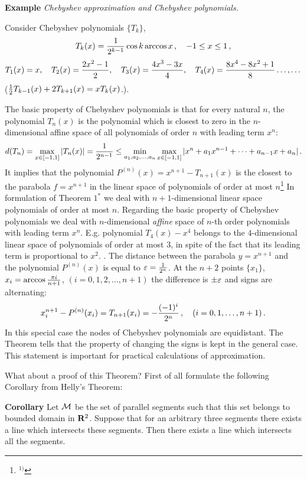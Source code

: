 {{\bf Example} {\it Chebyshev approximation and Chebyshev polynomials.}

   Consider Chebyshev polynomials $\{T_k\}$,
                      $$
T_k(x)={1\over 2^{k-1}}\cos k \arccos x\,,\quad -1\leq x\leq 1\,,
                      $$
                   $$
T_1(x)=x,\quad
T_2(x)={2x^2-1\over 2},\quad T_3(x)={4x^3-3x\over 4},\quad
  T_4(x)={8x^4-8x^2+1\over 8}\dots,\dots
                    $$
(${1\over 2}T_{k-1}(x)+2T_{k+1}(x)=xT_k(x)$.).

The basic property of Chebyshev polynomials is that for every natural
$n$, the polynomial
$T_n(x)$ is the polynomial which is 
closest to zero in the $n$-dimensional
 affine space of all polynomials
 of order $n$ with leading term $x^n$:
            $$
d(T_n)=\max_{x\in [-1,1]}|T_n(x)|={1\over 2^{n-1}}\leq
 \min_{a_1,a_2,\dots,a_n}\max_{x\in [-1,1]}
  |x^n+a_1x^{n-1}+\dots+a_{n-1}x+a_n|\,.
            $$
It implies that the 
polynomial $P^{(n)}(x)=x^{n+1}-T_{n+1}(x)$ is the closest
to the parabola $f=x^{n+1}$ in the linear space
of polynomials of order at most $n$\footnote{$^{1)}$}
{In formulation of Theorem
$1^*$ we deal with $n+1$-dimensional 
linear space polynomials of order at most $n$. 
Regarding the basic property of Chebyshev polynomials we deal with
$n$-dimensional {\it affine} space of $n$-th order  
polynomials with leading term $x^n$.
E.g. polynomial $T_4(x)-x^4$ belongs to the $4$-dimensional
linear space of polynomials of order at most $3$, 
in spite of the fact that its leading term is proportional to
$x^2$. }.
The distance between the parabola $y=x^{n+1}$
and the polynomial $P^{(n)}(x)$
is equal to ${\varepsilon}={1\over 2^n}$.
At the $n+2$ points $\{x_1\}$, $x_i=\arccos {\pi i\over n+1}$,
$(i=0,1,2,\dots,n+1)$
the difference 
is $\pm {\varepsilon}$ and signs are alternating:
         $$
  x_i^{n+1}-P^{(n)}(x_i)=T_{n+1}(x_i)=-{(-1)^i\over 2^n}\,,\quad
(i=0,1,\dots,n+1)\,.
         $$
In this special case the nodes of Chebyshev polynomials
are equidistant. The Theorem tells that
the property of changing the signs is kept in the general case.
This statement is important for practical 
calculations of approximation.              

\m
What about a proof of this Theorem?
First of all formulate the following Corollary from Helly's Theorem:

\m

  {\bf Corollary }
 Let $\cal M$ be the set of parallel segments such that
 this set  belongs to bounded domain in ${\bf R}^2$. 
Suppose that for an arbitrary three
segments there exists a line which intersects these segments.
Then there exists a line which intersects all the segments.

}
